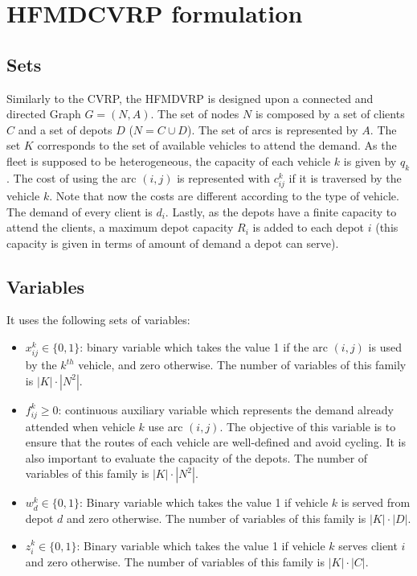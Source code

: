 \documentclass[preprint,review,12pt]{elsarticle}
\begin{document}
\section{HFMDCVRP formulation}

\subsection{Sets}
Similarly to the CVRP, the HFMDVRP is designed upon a connected and directed Graph $G = (N,A)$. The set of nodes $N$ is composed by a set of clients $C$ and a set of depots $D$ ($N = C \cup D$). The set of arcs is represented by $A$. The set $K$ corresponds to the set of available vehicles to attend the demand. As the fleet is supposed to be heterogeneous, the capacity of each vehicle $k$ is given by $q_k$. The cost of using the arc $(i,j)$ is represented with $c_{ij}^k$ if it is traversed by the vehicle $k$. Note that now the costs are different according to the type of vehicle. The demand of every client is $d_i$. Lastly, as the depots have a finite capacity to attend the clients, a maximum depot capacity $R_i$ is added to each depot $i$ (this capacity is given in terms of amount of demand a depot can serve).

\subsection{Variables}
It uses the following sets of variables:

\begin{itemize}
	\item $x_{ij}^k \in \{0,1\}$: binary variable which takes the value 1 if the arc $(i,j)$ is used by the $k^{th}$ vehicle, and zero otherwise. The number of variables of this family is $|K| \cdot |N^2|$.
	\item $f_{ij}^k \geq 0$: continuous auxiliary variable which represents the demand already attended when vehicle $k$ use arc $(i,j)$. The objective of this variable is to ensure that the routes of each vehicle are well-defined and avoid cycling. It is also important to evaluate the capacity of the depots. The number of variables of this family is $|K| \cdot |N^2|$.
	\item  $w_d^k \in  \{0,1\}$: Binary variable which takes the value 1 if vehicle $k$ is served from depot $d$ and zero otherwise. The number of variables of this family is $|K| \cdot |D|$.
	\item $z_{i}^k \in  \{0,1\}$: Binary variable which takes the value 1 if vehicle $k$ serves client $i$ and zero otherwise. The number of variables of this family is $|K| \cdot |C|$.
\end{itemize}
\end{document}

